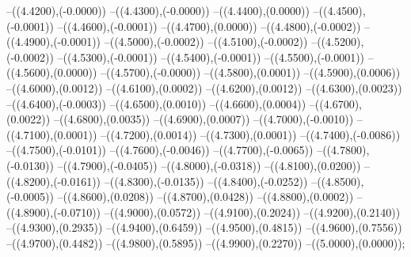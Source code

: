 {	--({\sx*(4.4200)},{\sy*(-0.0000)})
	--({\sx*(4.4300)},{\sy*(-0.0000)})
	--({\sx*(4.4400)},{\sy*(0.0000)})
	--({\sx*(4.4500)},{\sy*(-0.0001)})
	--({\sx*(4.4600)},{\sy*(-0.0001)})
	--({\sx*(4.4700)},{\sy*(0.0000)})
	--({\sx*(4.4800)},{\sy*(-0.0002)})
	--({\sx*(4.4900)},{\sy*(-0.0001)})
	--({\sx*(4.5000)},{\sy*(-0.0002)})
	--({\sx*(4.5100)},{\sy*(-0.0002)})
	--({\sx*(4.5200)},{\sy*(-0.0002)})
	--({\sx*(4.5300)},{\sy*(-0.0001)})
	--({\sx*(4.5400)},{\sy*(-0.0001)})
	--({\sx*(4.5500)},{\sy*(-0.0001)})
	--({\sx*(4.5600)},{\sy*(0.0000)})
	--({\sx*(4.5700)},{\sy*(-0.0000)})
	--({\sx*(4.5800)},{\sy*(0.0001)})
	--({\sx*(4.5900)},{\sy*(0.0006)})
	--({\sx*(4.6000)},{\sy*(0.0012)})
	--({\sx*(4.6100)},{\sy*(0.0002)})
	--({\sx*(4.6200)},{\sy*(0.0012)})
	--({\sx*(4.6300)},{\sy*(0.0023)})
	--({\sx*(4.6400)},{\sy*(-0.0003)})
	--({\sx*(4.6500)},{\sy*(0.0010)})
	--({\sx*(4.6600)},{\sy*(0.0004)})
	--({\sx*(4.6700)},{\sy*(0.0022)})
	--({\sx*(4.6800)},{\sy*(0.0035)})
	--({\sx*(4.6900)},{\sy*(0.0007)})
	--({\sx*(4.7000)},{\sy*(-0.0010)})
	--({\sx*(4.7100)},{\sy*(0.0001)})
	--({\sx*(4.7200)},{\sy*(0.0014)})
	--({\sx*(4.7300)},{\sy*(0.0001)})
	--({\sx*(4.7400)},{\sy*(-0.0086)})
	--({\sx*(4.7500)},{\sy*(-0.0101)})
	--({\sx*(4.7600)},{\sy*(-0.0046)})
	--({\sx*(4.7700)},{\sy*(-0.0065)})
	--({\sx*(4.7800)},{\sy*(-0.0130)})
	--({\sx*(4.7900)},{\sy*(-0.0405)})
	--({\sx*(4.8000)},{\sy*(-0.0318)})
	--({\sx*(4.8100)},{\sy*(0.0200)})
	--({\sx*(4.8200)},{\sy*(-0.0161)})
	--({\sx*(4.8300)},{\sy*(-0.0135)})
	--({\sx*(4.8400)},{\sy*(-0.0252)})
	--({\sx*(4.8500)},{\sy*(-0.0005)})
	--({\sx*(4.8600)},{\sy*(0.0208)})
	--({\sx*(4.8700)},{\sy*(0.0428)})
	--({\sx*(4.8800)},{\sy*(0.0002)})
	--({\sx*(4.8900)},{\sy*(-0.0710)})
	--({\sx*(4.9000)},{\sy*(0.0572)})
	--({\sx*(4.9100)},{\sy*(0.2024)})
	--({\sx*(4.9200)},{\sy*(0.2140)})
	--({\sx*(4.9300)},{\sy*(0.2935)})
	--({\sx*(4.9400)},{\sy*(0.6459)})
	--({\sx*(4.9500)},{\sy*(0.4815)})
	--({\sx*(4.9600)},{\sy*(0.7556)})
	--({\sx*(4.9700)},{\sy*(0.4482)})
	--({\sx*(4.9800)},{\sy*(0.5895)})
	--({\sx*(4.9900)},{\sy*(0.2270)})
	--({\sx*(5.0000)},{\sy*(0.0000)});
}
